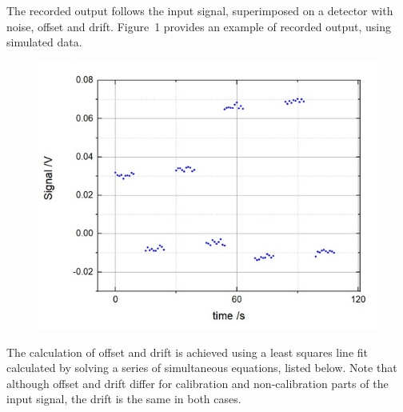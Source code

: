 \documentclass{IMEKO2024}
\begin{document}
The recorded output follows the input signal, superimposed on a detector with noise, offset and drift. Figure~1 %
provides an example of recorded output, using simulated data.
\begin{figure}[H]
  \begin{center}
    \includegraphics[width=0.6\linewidth]{example_output.jpg}
    \label{fig:rec_out}
  \end{center}
\end{figure}

The calculation of offset and drift is achieved using a least squares line fit calculated by solving a series of simultaneous equations, listed below. Note that although offset and drift differ for calibration and non-calibration parts of the input signal, the drift is the same in both cases.

\end{document}
